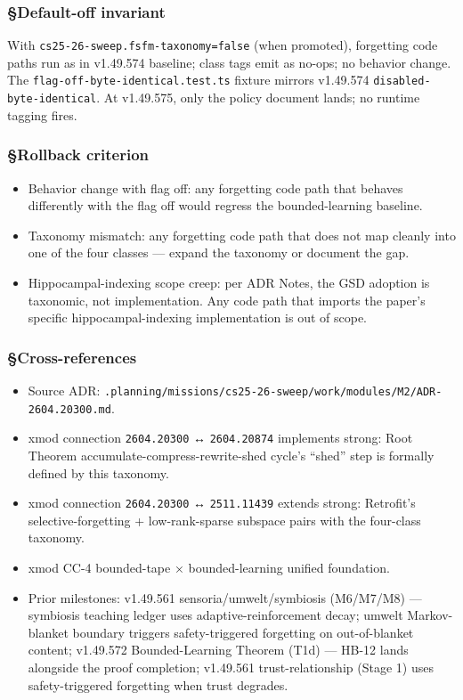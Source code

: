 \documentclass[11pt,letterpaper]{article}
\newcommand{\arxivid}[1]{\texttt{\textcolor{accent}{#1}}}
\providecommand{\tightlist}{\setlength{\itemsep}{0pt}\setlength{\parskip}{0pt}}
\begin{document}
\subsubsection{§Default-off invariant}

With \texttt{cs25-26-sweep.fsfm-taxonomy=false} (when promoted),
forgetting code paths run as in v1.49.574 baseline; class tags emit as
no-ops; no behavior change. The \texttt{flag-off-byte-identical.test.ts}
fixture mirrors v1.49.574 \texttt{disabled-byte-identical}. At
v1.49.575, only the policy document lands; no runtime tagging fires.

\subsubsection{§Rollback criterion}

\begin{itemize}
\tightlist
\item
  Behavior change with flag off: any forgetting code path that behaves
  differently with the flag off would regress the bounded-learning
  baseline.
\item
  Taxonomy mismatch: any forgetting code path that does not map cleanly
  into one of the four classes --- expand the taxonomy or document the
  gap.
\item
  Hippocampal-indexing scope creep: per ADR Notes, the GSD adoption is
  taxonomic, not implementation. Any code path that imports the paper's
  specific hippocampal-indexing implementation is out of scope.
\end{itemize}

\subsubsection{§Cross-references}

\begin{itemize}
\tightlist
\item
  Source ADR:
  \texttt{.planning/missions/cs25-26-sweep/work/modules/M2/ADR-\arxivid{2604.20300}.md}.
\item
  xmod connection \arxivid{2604.20300} ↔ \arxivid{2604.20874} implements
  strong: Root Theorem accumulate-compress-rewrite-shed cycle's ``shed''
  step is formally defined by this taxonomy.
\item
  xmod connection \arxivid{2604.20300} ↔ \arxivid{2511.11439} extends
  strong: Retrofit's selective-forgetting + low-rank-sparse subspace
  pairs with the four-class taxonomy.
\item
  xmod CC-4 bounded-tape × bounded-learning unified foundation.
\item
  Prior milestones: v1.49.561 sensoria/umwelt/symbiosis (M6/M7/M8) ---
  symbiosis teaching ledger uses adaptive-reinforcement decay; umwelt
  Markov-blanket boundary triggers safety-triggered forgetting on
  out-of-blanket content; v1.49.572 Bounded-Learning Theorem (T1d) ---
  HB-12 lands alongside the proof completion; v1.49.561
  trust-relationship (Stage 1) uses safety-triggered forgetting when
  trust degrades.
\end{itemize}
\end{document}
